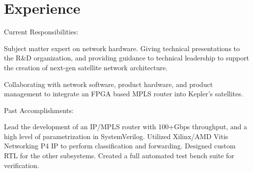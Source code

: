 \documentclass[10pt]{deedy-resume-reversed}
\begin{document}
%
%

%
%

%
%

\begin{minipage}[t]{1.0\textwidth}


\vspace{\topsep} %
\section{Experience}
\newline
{}
Current Responsibilities:
\vspace{\topsep} %
\begin{tightemize}
\item Subject matter expert on network hardware. Giving technical presentations to the R\&D organization, and
providing guidance to technical leadership to support the creation of next-gen satellite network architecture.
\item Collaborating with network software, product hardware, and product management to integrate
an FPGA based MPLS router into Kepler's satellites.
\end{tightemize}
Past Accomplishments:
\begin{tightemize}
\item Lead the development of an IP/MPLS router with 100+Gbps throughput, and a high level of parametrization in SystemVerilog.
Utilized Xilinx/AMD Vitis Networking P4 IP to perform classification and forwarding. Designed custom RTL for the other
subsystems. Created a full automated test bench suite for verification.
\end{tightemize}
\sectionsep


\end{minipage}
\end{document}
